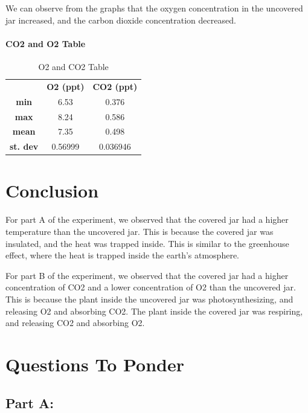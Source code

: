\documentclass[a4paper, 12pt, english]{article}
\begin{document}
We can observe from the graphs that the oxygen concentration in the uncovered
jar increased, and the carbon dioxide concentration decreased.

\paragraph{CO2 and O2 Table}
\begin{table}[H]
	\caption{\label{tab:Table 3} O2 and CO2 Table}
	\centering
	\begin{tabular}{c c c}
		\toprule
		                 & \textbf{O2 (ppt)}
		                 & \textbf{CO2 (ppt)}           \\
		\cmidrule[0.4pt](r{0.125em}){1-1}%
		\cmidrule[0.4pt](lr{0.125em}){2-2}%
		\cmidrule[0.4pt](lr{0.125em}){3-3}%
		\textbf{min}     & 6.53                & 0.376   \\
		\textbf{max}     & 8.24               & 0.586   \\
		\textbf{mean}    & 7.35               & 0.498   \\
		\textbf{st. dev} & 0.56999            & 0.036946
	\end{tabular}
\end{table}

\section{Conclusion}
For part A of the experiment, we observed that the covered jar had a higher
temperature than the uncovered jar. This is because the covered jar was
insulated, and the heat was trapped inside. This is similar to the greenhouse
effect, where the heat is trapped inside the earth's atmosphere.

For part B of the experiment, we observed that the covered jar had a higher
concentration of CO2 and a lower concentration of O2 than the uncovered jar.
This is because the plant inside the uncovered jar was photosynthesizing, and
releasing O2 and absorbing CO2. The plant inside the covered jar was
respiring, and releasing CO2 and absorbing O2.

\section{Questions To Ponder}
\subsection{Part A:}
\end{document}
